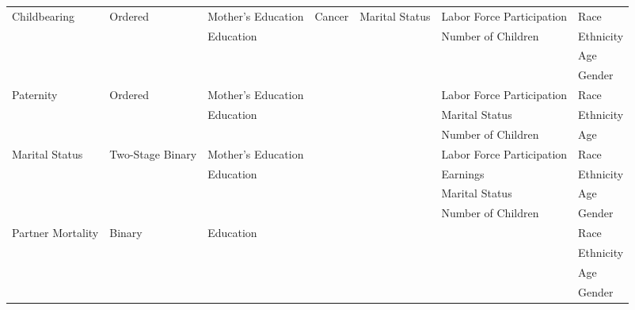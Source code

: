 \begin{table}
\begin{scriptsize}
\begin{tabular}{lllllll}
\midrule		
Childbearing & Ordered & Mother's Education  & Cancer & Marital Status & Labor Force Participation & Race \\
&  & Education  & & & Number of Children & Ethnicity \\
&  & & & &  & Age \\
& & & & & & Gender \\
\midrule		
Paternity & Ordered & Mother's Education & & & Labor Force Participation & Race \\
&  & Education & & & Marital Status  & Ethnicity \\
&  & & & & Number of Children  & Age \\
\midrule
Marital Status & Two-Stage Binary & Mother's Education & & & Labor Force Participation & Race \\
& & Education & & & Earnings & Ethnicity \\
& & & & & Marital Status & Age \\
& & & & & Number of Children & Gender \\
\midrule		
Partner Mortality & Binary & Education & & & & Race \\
& & & & &  & Ethnicity \\
& & & & & & Age \\
& & & & & & Gender \\
\bottomrule
\end{tabular}
\end{scriptsize}
\end{table}

